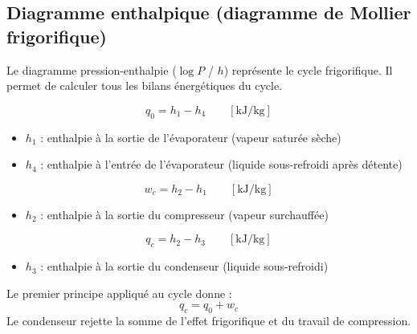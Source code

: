\subsection{Diagramme enthalpique (diagramme de Mollier frigorifique)}

Le diagramme pression-enthalpie ($\log P$ / $h$) représente le cycle frigorifique. Il permet de calculer tous les bilans énergétiques du cycle.

\begin{definition}[title=Effet frigorifique]
\begin{equation}
  q_0 = h_1 - h_4 \qquad \left[\si{\kilo\joule\per\kilogram}\right]
  \label{eq:effet_frigo}
\end{equation}
\begin{itemize}
  \item $h_1$ : enthalpie à la sortie de l'évaporateur (vapeur saturée sèche)
  \item $h_4$ : enthalpie à l'entrée de l'évaporateur (liquide sous-refroidi après détente)
\end{itemize}
\end{definition}

\begin{definition}[title=Travail de compression]
\begin{equation}
  w_c = h_2 - h_1 \qquad \left[\si{\kilo\joule\per\kilogram}\right]
  \label{eq:travail_compresseur}
\end{equation}
\begin{itemize}
  \item $h_2$ : enthalpie à la sortie du compresseur (vapeur surchauffée)
\end{itemize}
\end{definition}

\begin{definition}[title=Effet de condensation]
\begin{equation}
  q_c = h_2 - h_3 \qquad \left[\si{\kilo\joule\per\kilogram}\right]
  \label{eq:effet_condenseur}
\end{equation}
\begin{itemize}
  \item $h_3$ : enthalpie à la sortie du condenseur (liquide sous-refroidi)
\end{itemize}
\end{definition}

\begin{definition}[title=Bilan énergétique du cycle]
Le premier principe appliqué au cycle donne :
\begin{equation}
  q_c = q_0 + w_c
  \label{eq:bilan_cycle}
\end{equation}
Le condenseur rejette la somme de l'effet frigorifique et du travail de compression.
\end{definition}

